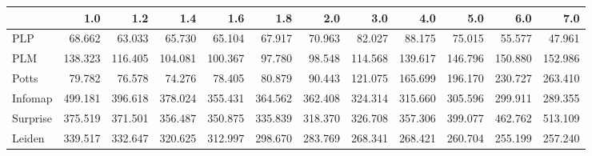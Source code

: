 \begin{tabular}{lrrrrrrrrrrr}
\toprule
{} &     1.0 &     1.2 &     1.4 &     1.6 &     1.8 &     2.0 &     3.0 &     4.0 &     5.0 &     6.0 &     7.0 \\
\midrule
PLP      &  68.662 &  63.033 &  65.730 &  65.104 &  67.917 &  70.963 &  82.027 &  88.175 &  75.015 &  55.577 &  47.961 \\
PLM      & 138.323 & 116.405 & 104.081 & 100.367 &  97.780 &  98.548 & 114.568 & 139.617 & 146.796 & 150.880 & 152.986 \\
Potts    &  79.782 &  76.578 &  74.276 &  78.405 &  80.879 &  90.443 & 121.075 & 165.699 & 196.170 & 230.727 & 263.410 \\
Infomap  & 499.181 & 396.618 & 378.024 & 355.431 & 364.562 & 362.408 & 324.314 & 315.660 & 305.596 & 299.911 & 289.355 \\
Surprise & 375.519 & 371.501 & 356.487 & 350.875 & 335.839 & 318.370 & 326.708 & 357.306 & 399.077 & 462.762 & 513.109 \\
Leiden   & 339.517 & 332.647 & 320.625 & 312.997 & 298.670 & 283.769 & 268.341 & 268.421 & 260.704 & 255.199 & 257.240 \\
\bottomrule
\end{tabular}

